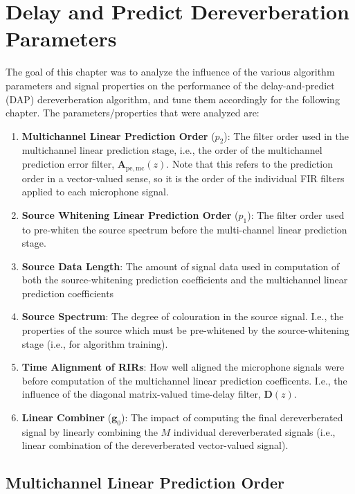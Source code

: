 \chapter{Delay and Predict Dereverberation Parameters}

The goal of this chapter was to analyze the influence of the various algorithm parameters and signal properties on the performance of the delay-and-predict (DAP) dereverberation algorithm, and tune them accordingly for the following chapter. The parameters/properties that were analyzed are:

\begin{enumerate}
	\item \textbf{Multichannel Linear Prediction Order} ($p_2$): The filter order used in the multichannel linear prediction stage, i.e., the order of the multichannel prediction error filter, $\boldsymbol{A}_{\mathrm{pe,mc}}(z)$. Note that this refers to the prediction order in a vector-valued sense, so it is the order of the individual FIR filters applied to each microphone signal.
	\item \textbf{Source Whitening Linear Prediction Order} ($p_1$): The filter order used to pre-whiten the source spectrum before the multi-channel linear prediction stage.
	\item \textbf{Source Data Length}: The amount of signal data used in computation of both the source-whitening prediction coefficients and the multichannel linear prediction coefficients
	\item \textbf{Source Spectrum}: The degree of colouration in the source signal. I.e., the properties of the source which must be pre-whitened by the source-whitening stage (i.e., for algorithm training).
	\item \textbf{Time Alignment of RIRs}: How well aligned the microphone signals were before computation of the multichannel linear prediction coefficents. I.e., the influence of the diagonal matrix-valued time-delay filter, $\boldsymbol{D}(z)$.
	\item \textbf{Linear Combiner} ($\boldsymbol{g}_0$): The impact of computing the final dereverberated signal by linearly combining the $M$ individual dereverberated signals (i.e., linear combination of the dereverberated vector-valued signal).
\end{enumerate}

\section{Multichannel Linear Prediction Order} \label{section:params_p2} 

